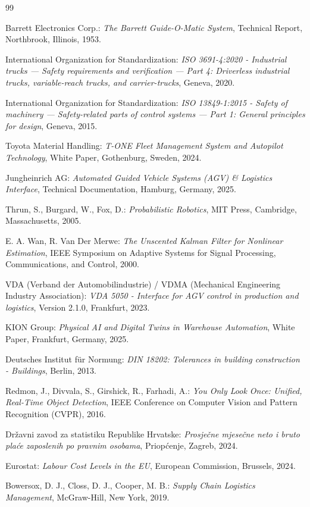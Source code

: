 \documentclass[12pt,a4paper]{article}
\begin{document}
\begin{thebibliography}{99}

 Barrett Electronics Corp.: \textit{The Barrett Guide-O-Matic System}, Technical Report, Northbrook, Illinois, 1953.

 International Organization for Standardization: \textit{ISO 3691-4:2020 - Industrial trucks — Safety requirements and verification — Part 4: Driverless industrial trucks, variable-reach trucks, and carrier-trucks}, Geneva, 2020.

 International Organization for Standardization: \textit{ISO 13849-1:2015 - Safety of machinery — Safety-related parts of control systems — Part 1: General principles for design}, Geneva, 2015.

 Toyota Material Handling: \textit{T-ONE Fleet Management System and Autopilot Technology}, White Paper, Gothenburg, Sweden, 2024.

 Jungheinrich AG: \textit{Automated Guided Vehicle Systems (AGV) \& Logistics Interface}, Technical Documentation, Hamburg, Germany, 2025.

 Thrun, S., Burgard, W., Fox, D.: \textit{Probabilistic Robotics}, MIT Press, Cambridge, Massachusetts, 2005.

 E. A. Wan, R. Van Der Merwe: \textit{The Unscented Kalman Filter for Nonlinear Estimation}, IEEE Symposium on Adaptive Systems for Signal Processing, Communications, and Control, 2000.

 VDA (Verband der Automobilindustrie) / VDMA (Mechanical Engineering Industry Association): \textit{VDA 5050 - Interface for AGV control in production and logistics}, Version 2.1.0, Frankfurt, 2023.

 KION Group: \textit{Physical AI and Digital Twins in Warehouse Automation}, White Paper, Frankfurt, Germany, 2025.

 Deutsches Institut für Normung: \textit{DIN 18202: Tolerances in building construction - Buildings}, Berlin, 2013.

 Redmon, J., Divvala, S., Girshick, R., Farhadi, A.: \textit{You Only Look Once: Unified, Real-Time Object Detection}, IEEE Conference on Computer Vision and Pattern Recognition (CVPR), 2016.

 Državni zavod za statistiku Republike Hrvatske: \textit{Prosječne mjesečne neto i bruto plaće zaposlenih po pravnim osobama}, Priopćenje, Zagreb, 2024.

 Eurostat: \textit{Labour Cost Levels in the EU}, European Commission, Brussels, 2024.

 Bowersox, D. J., Closs, D. J., Cooper, M. B.: \textit{Supply Chain Logistics Management}, McGraw-Hill, New York, 2019.

\end{thebibliography}
\end{document}
